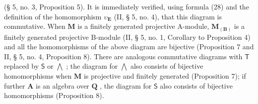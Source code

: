 (§ 5, no. 3, Proposition 5). It is immediately verified, using formula (28) and the definition of the homomorphism \(\upsilon_{\mathbf{E}}\) (II, § 5, no. 4), that this diagram is commutative. When \(\mathbf{M}\) is a finitely generated projective A-module, \(\mathbf{M}_{(\mathbf{B})}\) is a finitely generated projective B-module (II, § 5, no. 1, Corollary to Proposition 4) and all the homomorphisms of the above diagram are bijective (Proposition 7 and II, § 5, no. 4, Proposition 8). There are analogous commutative diagrams with \(\mathsf{T}\) replaced by \(\mathsf{S}\) or \(\bigwedge\) ; the diagram for \(\bigwedge\) also consists of bijective homomorphisms when \(\mathbf{M}\) is projective and finitely generated (Proposition 7); if further \(\mathbf{A}\) is an algebra over \(\mathbf{Q}\) , the diagram for \(\mathsf{S}\) also consists of bijective homomorphisms (Proposition 8).

